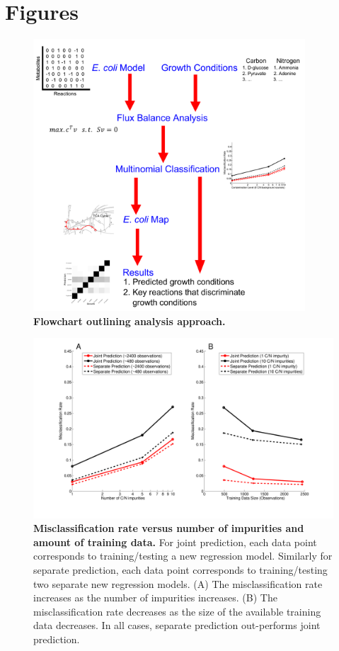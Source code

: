 \documentclass[12pt]{article}
\begin{document}
\newpage

\section*{Figures}

\begin{figure}[!ht]
\centerline{\includegraphics[width=4in]{Figures/flowchart_new.pdf}}
\caption{\label{fig:flowchart}\textbf{Flowchart outlining analysis approach.}}
\end{figure}

\clearpage
\begin{figure}[!ht]
\centerline{\includegraphics[width=5.5in]{Figures/combinedContaminationTrainingdata.pdf}}
\caption{\label{fig:misclassification}\textbf{Misclassification rate versus number of impurities and amount of training data.} For joint prediction, each data point corresponds to training/testing a new regression model. Similarly for separate prediction, each data point corresponds to training/testing two separate new regression models. (A) The misclassification rate increases as the number of impurities increases. (B) The misclassification rate decreases as the size of the available training data decreases. In all cases, separate prediction out-performs joint prediction.}
\end{figure}
\end{document}
